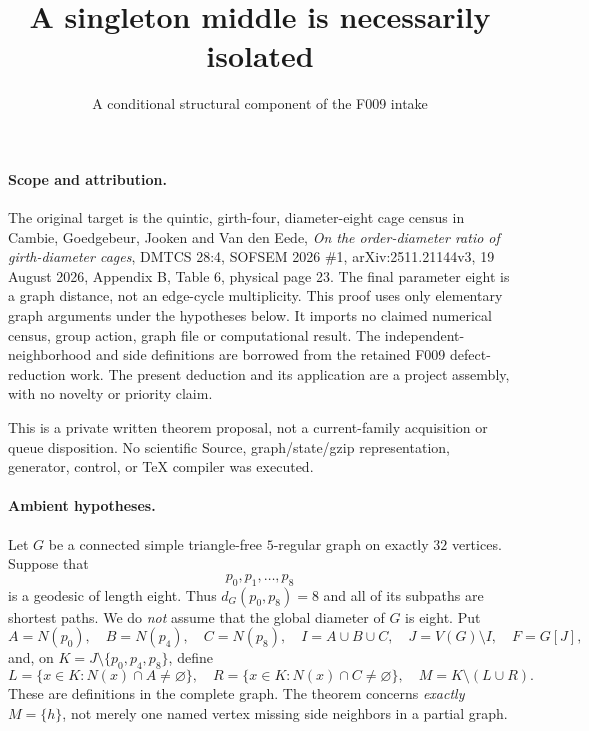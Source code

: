 \documentclass[11pt]{article}
\title{A singleton middle is necessarily isolated}
\author{A conditional structural component of the F009 intake}
\date{}
\begin{document}
\maketitle

\paragraph{Scope and attribution.}
The original target is the quintic, girth-four, diameter-eight cage census
in Cambie, Goedgebeur, Jooken and Van den Eede,
\emph{On the order-diameter ratio of girth-diameter cages},
DMTCS 28:4, SOFSEM 2026 \#1, arXiv:2511.21144v3,
19 August 2026, Appendix B, Table 6, physical page 23.
The final parameter eight is a graph distance, not an edge-cycle
multiplicity. This proof uses only elementary graph arguments under the
hypotheses below. It imports no claimed numerical census, group action,
graph file or computational result. The independent-neighborhood and side
definitions are borrowed from the retained F009 defect-reduction work.
The present deduction and its application are a project assembly, with
no novelty or priority claim.

This is a private written theorem proposal, not a current-family
acquisition or queue disposition. No scientific Source, graph/state/gzip
representation, generator, control, or TeX compiler was executed.

\paragraph{Ambient hypotheses.}
Let $G$ be a connected simple triangle-free $5$-regular graph on exactly
$32$ vertices. Suppose that
\[
 p_0,p_1,\ldots,p_8
\]
is a geodesic of length eight. Thus $d_G(p_0,p_8)=8$ and all of its
subpaths are shortest paths. We do \emph{not} assume that the global
diameter of $G$ is eight. Put
\[
 A=N(p_0),\quad B=N(p_4),\quad C=N(p_8),\quad
 I=A\cup B\cup C,\quad J=V(G)\setminus I,\quad F=G[J],
\]
and, on $K=J\setminus\{p_0,p_4,p_8\}$, define
\[
 L=\{x\in K:N(x)\cap A\ne\varnothing\},\quad
 R=\{x\in K:N(x)\cap C\ne\varnothing\},\quad
 M=K\setminus(L\cup R).
\]
These are definitions in the complete graph. The theorem concerns
\emph{exactly} $M=\{h\}$, not merely one named vertex missing side
neighbors in a partial graph.
\end{document}
